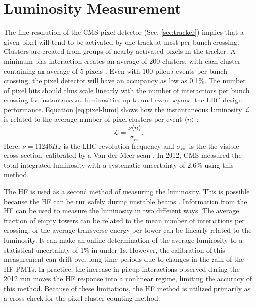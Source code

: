 \documentclass[12pt]{thesis}  %
\begin{document}
\section{Luminosity Measurement
\label{sec:lumimeas}}

The fine resolution of the CMS pixel detector (Sec. \ref{sec:tracker}) implies that a given pixel will tend to be activated by one track at most per bunch crossing. Clusters are created from groups of nearby activated pixels in the tracker. A minimum bias interaction creates an average of 200 clusters, with each cluster containing an average of 5 pixels \cite{CMS-PAS-LUM-12-001}. Even with 100 pileup events per bunch crossing, the pixel detector will have an occupancy as low as 0.1\%. The number of pixel hits should thus scale linearly with the number of interactions per bunch crossing for instantaneous luminosities up to and even beyond the LHC design performance. Equation \eqref{eq:pixel-lumi} shows how the instantaneous luminosity $\mathcal{L}$ is related to the average number of pixel clusters per event $\langle n \rangle$ \cite{CMS-PAS-LUM-13-001}:
\begin{equation} \label{eq:pixel-lumi}
\mathcal{L} = \frac{\nu \langle n \rangle}{\sigma_\text{vis}}.
\end{equation}
Here, $\nu = 11246\unit{Hz}$ is the LHC revolution frequency and $\sigma_\text{vis}$ is the the visible cross section, calibrated by a Van der Meer scan \cite{Balagura:2011yw}. In 2012, CMS measured the total integrated luminosity with a systematic uncertainty of 2.6\% using this method.

The HF is used as a second method of measuring the luminosity. This is possible because the HF can be run safely during unstable beams \cite{CMS-PAS-LUM-13-001}. Information from the HF can be used to measure the luminosity in two different ways. The average fraction of empty towers can be related to the mean number of interactions per crossing, or the average transverse energy per tower can be linearly related to the luminosity. It can make an online determination of the average luminosity to a statistical uncertainty of 1\% in under 1\unit{s}. However, the calibration of this measurement can drift over long time periods due to changes in the gain of the HF PMTs. In practice, the increase in pileup interactions observed during the 2012 run moves the HF response into a nonlinear regime, limiting the accuracy of this method. Because of these limitations, the HF method is utilized primarily as a cross-check for the pixel cluster counting method.
\end{document}
